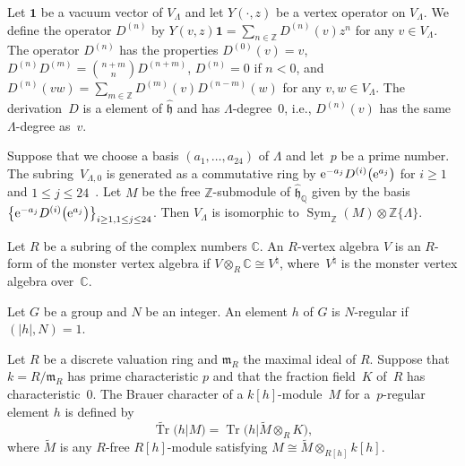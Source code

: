 \documentclass[pdftex]{sigma}%
\numberwithin{equation}{section}
\begin{document}
Let $\mathbf{1}$ be a vacuum vector of $V_{\Lambda}$ and let $Y(\cdot,z)$ be a vertex operator on $V_{\Lambda}$.
We define the operator $D^{(n)}$ by $Y(v,z)\mathbf{1}=\sum_{n\in \mathbb{Z}}D^{(n)}(v)z^n$ for any $v\in V_{\Lambda}$. The operator $D^{(n)}$ has the properties $D^{(0)}(v)=v$, $D^{(n)}D^{(m)}={n+m \choose n}D^{(n+m)}$, $D^{(n)}=0$ if $n<0$, and $D^{(n)}(vw)=\sum_{m\in \mathbb{Z}}D^{(m)}(v)D^{(n-m)}(w)$ for any $v,w \in V_\Lambda$. The derivation~$D$ is a element of $\hat{\mathfrak{h}}$ and has $\Lambda$-degree~0, i.e., $D^{(n)}(v)$ has the same $\Lambda$-degree as~$v$.

Suppose that we choose a basis $(a_1,\dots,a_{24})$ of $\Lambda$ and let~$p$ be a prime number. The sub\-ring~$V_{\Lambda,0}$ is generated as a commutative ring by ${\rm e}^{-a_j}D^{(i)}\big({\rm e}^{a_j}\big)$ for $i\geq 1$ and $1\leq j \leq 24$~\cite{BR}. Let $M$ be the free $\mathbb{Z}$-submodule of $\hat{\mathfrak{h}}_\mathbb{Q}$ given by the basis $\big\{{\rm e}^{-a_j}D^{(i)}\big({\rm e}^{a_j}\big)\big\}_{i\geq 1,1\leq j \leq 24}$. Then $V_{\Lambda}$ is isomorphic to $\operatorname{Sym}_{\mathbb{Z}}(M)\otimes \mathbb{Z}\{\Lambda\}$.

\begin{Definition}Let $R$ be a subring of the complex numbers $\mathbb{C}$. An $R$-vertex algebra $V$ is an $R$-form of the monster vertex algebra if $V\otimes_R\mathbb{C}\cong V^\natural$, where~$V^\natural$ is the monster vertex algebra over~$\mathbb{C}$.
\end{Definition}

\begin{Definition}
Let $G$ be a group and $N$ be an integer. An element $h$ of $G$ is $N$-regular if $(|h|,N)=1$.
\end{Definition}

\begin{Definition}
Let $R$ be a discrete valuation ring and $\mathfrak{m}_R$ the maximal ideal of $R$. Suppose that $k=R/\mathfrak{m}_R$ has prime characteristic $p$ and that the fraction field~$K$ of~$R$ has characteristic~$0$. The Brauer character of a $k[h]$-module~$M$ for a~$p$-regular element $h$ is defined by
\[
\widetilde{\operatorname{Tr}}(h|M)=\operatorname{Tr}\big(h|\widetilde{M}\otimes_RK\big),
\]
 where $\widetilde{M}$ is any $R$-free $R[h]$-module satisfying $M\cong\widetilde{M}\otimes_{R[h]}k[h]$.
\end{Definition}
\end{document}
